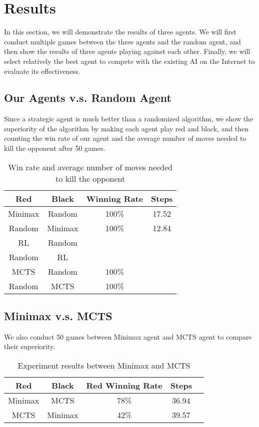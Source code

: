 \documentclass[letterpaper]{article}
\begin{document}
\section{Results}\label{sec:results}
In this section, we will demonstrate the results of three agents.
We will first conduct multiple games between the three agents and the random agent, and then show the results of three agents playing against each other.
Finally, we will select relatively the best agent to compete with the existing AI on the Internet to evaluate its effectiveness.

\subsection{Our Agents v.s. Random Agent}
\label{subsec:our-agents-vs-random-agent}
Since a strategic agent is much better than a randomized algorithm, we show the superiority of the algorithm by making each agent play red and black, and then counting the win rate of our agent and the average number of moves needed to kill the opponent after 50 games.
\begin{table}[htbp]
    \centering
    \caption{Win rate and average number of moves needed to kill the opponent}
    \label{tab:tab1}
    \begin{tabular}{|c|c|c|c|}
        \hline
        Red & Black & Winning Rate & Steps  \\ \hline
        Minimax & Random & 100\% & 17.52 \\ \hline
        Random & Minimax & 100\% & 12.84 \\ \hline
        RL & Random &  &  \\ \hline
        Random & RL &  & \\ \hline
        MCTS & Random & 100\% & \\ \hline
        Random & MCTS & 100\% & \\ \hline
    \end{tabular}
\end{table}

\subsection{Minimax v.s. MCTS}
\label{subsec:minimax-v.s.-mcts}
We also conduct 50 games between Minimax agent and MCTS agent to compare their superiority.
\begin{table}[htbp]
    \centering
    \caption{Experiment results between Minimax and MCTS}
    \label{tab:tab2}
    \begin{tabular}{|c|c|c|c|c|}
        \hline
        Red & Black & Red Winning Rate & Steps  \\ \hline
        Minimax & MCTS & 78\% & 36.94 \\ \hline
        MCTS & Minimax & 42\% & 39.57 \\ \hline
    \end{tabular}
\end{table}
\end{document}
